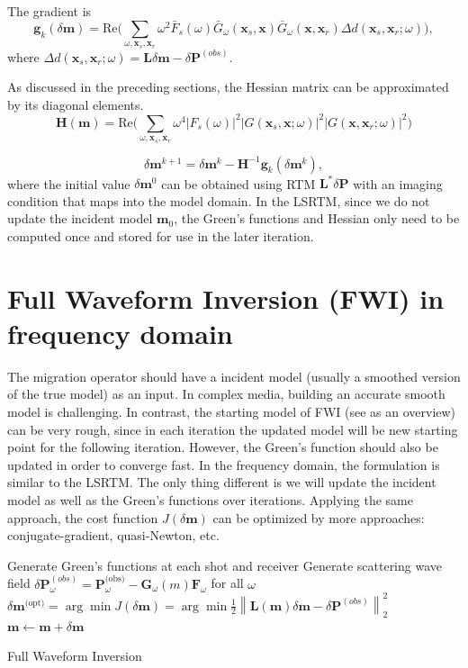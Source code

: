 \documentclass[11pt]{article}
\newcommand{\bx}{\boldsymbol{x}}
\newcommand{\bF}{\boldsymbol{F}}
\newcommand{\bG}{\boldsymbol{G}}
\newcommand{\bg}{\boldsymbol{g}}
\newcommand{\bH}{\boldsymbol{H}}
\newcommand{\bL}{\boldsymbol{L}}
\newcommand{\bm}{\boldsymbol{m}}
\newcommand{\bP}{\boldsymbol{P}}
\theoremstyle{plain}
\theoremstyle{definition}
\theoremstyle{remark}
\numberwithin{equation}{section}
\begin{document}
The gradient is 
\begin{equation}
\bg_k(\delta\bm)=\text{Re}\bigg(\sum_{\omega,\bx_s,\bx_r } \omega^2  \bar{F}_s(\omega) \bar{G}_\omega(\bx_s,\bx)\bar{ G}_\omega(\bx,\bx_r)\Delta d(\bx_s,\bx_r;\omega)\bigg), 
\end{equation}
where $\Delta d(\bx_s,\bx_r;\omega)=\bL\delta \bm - \delta\bP^{(obs)}$. 

As discussed in the preceding sections, the Hessian matrix can be approximated by its diagonal elements.
\begin{equation}
\bH(\bm)= \text{Re}\bigg( \sum_{\omega,\bx_s,\bx_r} \omega^4 |F_s(\omega)|^2 |G(\bx_s,\bx;\omega)|^2 |G(\bx,\bx_r;\omega)|^2 \bigg)
\end{equation} 

\begin{equation}
\delta \bm^{k+1}=\delta \bm^{k} - \bH^{-1} \bg_k(\delta \bm^k),
\end{equation}
where the initial value $\delta \bm^0$ can be obtained using RTM $\bL^* \delta \bP$ with an imaging condition that maps into the model domain.
In the LSRTM, since we do not update the incident model $\bm_0$, the Green's functions and Hessian only need to be computed once and stored
for use in the later iteration. 


\section{Full Waveform Inversion (FWI) in frequency domain}
The migration operator should have a incident model (usually a smoothed version of the true model) as an input. In complex media, building an accurate smooth model is challenging. In contrast, the starting model of FWI (see \cite{VirOpe2009} as an overview) can be very rough, since in each iteration the updated model will be new starting point for the following iteration. However, the Green's function should also be updated in order to converge fast. In the frequency domain, the formulation is similar to the LSRTM. The only thing different is we will update the incident model as well as the Green's functions over iterations. Applying the same approach, the cost function $J(\delta \bm)$ can be optimized by more approaches: conjugate-gradient, quasi-Newton, etc.

\begin{algorithm}[H]
\begin{algorithmic}[1]
\WHILE{$m(\bx)$ is not converged}
\STATE Generate Green's functions at each shot and receiver
\STATE Generate scattering wave field $\delta\bP^{(obs)}_{\omega}= \bP_{\omega}^{\text{(obs)}} - \bG_{\omega}(m)\bF_{\omega}$ for all $\omega$
\STATE $\delta \bm^{\text{(opt)}} = \arg\min J(\delta \bm) = \arg\min \frac{1}{2} \left\| \bL(\bm)\delta \bm - \delta\bP^{(obs)}\right\|_2^2$
\STATE $\bm \leftarrow \bm + \delta \bm$
\ENDWHILE
\end{algorithmic}
\caption{Full Waveform Inversion}
\end{algorithm}
\end{document}
